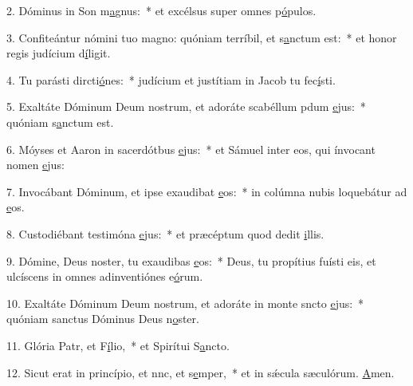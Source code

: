 2. Dóminus in Son m\uline{a}gnus:~* et excélsus super omnes p\uline{ó}pulos.\par 
3. Confiteántur nómini tuo magno: quóniam terríbil, et s\uline{a}nctum est:~* et honor regis judícium d\uline{í}ligit.\par 
4. Tu parásti dircti\uline{ó}nes:~* judícium et justítiam in Jacob tu fec\uline{í}sti.\par 
5. Exaltáte Dóminum Deum nostrum, et adoráte scabéllum pdum \uline{e}jus:~* quóniam s\uline{a}nctum est.\par 
6. Móyses et Aaron in sacerdótbus \uline{e}jus:~* et Sámuel inter eos, qui ínvocant nomen \uline{e}jus:\par 
7. Invocábant Dóminum, et ipse exaudibat \uline{e}os:~* in colúmna nubis loquebátur ad \uline{e}os.\par 
8. Custodiébant testimóna \uline{e}jus:~* et præcéptum quod dedit \uline{i}llis.\par 
9. Dómine, Deus noster, tu exaudibas \uline{e}os:~* Deus, tu propítius fuísti eis, et ulcíscens in omnes adinventiónes e\uline{ó}rum.\par 
10. Exaltáte Dóminum Deum nostrum, et adoráte in monte sncto \uline{e}jus:~* quóniam sanctus Dóminus Deus n\uline{o}ster.\par 
11. Glória Patr, et F\uline{í}lio,~* et Spirítui S\uline{a}ncto.\par 
12. Sicut erat in princípio, et nnc, et s\uline{e}mper,~* et in sǽcula sæculórum. \uline{A}men.\par 
